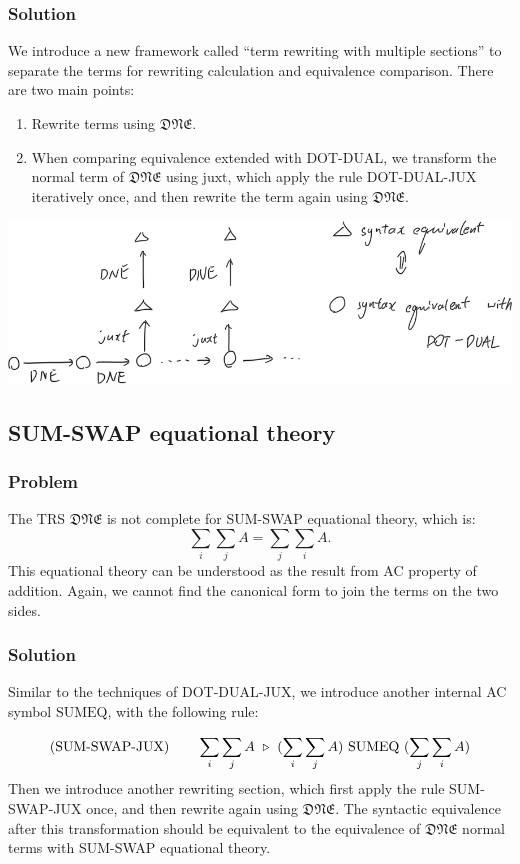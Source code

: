 \subsubsection*{Solution}
We introduce a new framework called ``term rewriting with multiple sections'' to separate the terms for rewriting calculation and equivalence comparison. There are two main points:
\begin{enumerate}
    \item Rewrite terms using $\mathfrak{DNE}$.
    \item When comparing equivalence extended with \textsf{DOT-DUAL}, we transform the normal term of $\mathfrak{DNE}$ using $\textrm{juxt}$, which apply the rule DOT-DUAL-JUX iteratively once, and then rewrite the term again using $\mathfrak{DNE}$.
\end{enumerate}

\begin{center}
    \includegraphics*[width=.8\textwidth]{fig/DNE-JUX.png}
\end{center}

\subsection{\textsf{SUM-SWAP} equational theory}
\subsubsection*{Problem}
The TRS $\mathfrak{DNE}$ is not complete for \textsf{SUM-SWAP} equational theory, which is:
$$
\sum_i \sum_j A = \sum_j \sum_i A.
$$
This equational theory can be understood as the result from AC property of addition. Again, we cannot find the canonical form to join the terms on the two sides.

\subsubsection*{Solution}
Similar to the techniques of DOT-DUAL-JUX, we introduce another internal AC symbol $\textrm{SUMEQ}$, with the following rule:

$$
\textrm{(SUM-SWAP-JUX)} \qquad \sum_i \sum_j A \ \triangleright\  (\sum_i \sum_j A)\ \textrm{SUMEQ}\ (\sum_j \sum_i A)
$$
Then we introduce another rewriting section, which first apply the rule SUM-SWAP-JUX once, and then rewrite again using $\mathfrak{DNE}$. The syntactic equivalence after this transformation should be equivalent to the equivalence of $\mathfrak{DNE}$ normal terms with \textsf{SUM-SWAP} equational theory.


